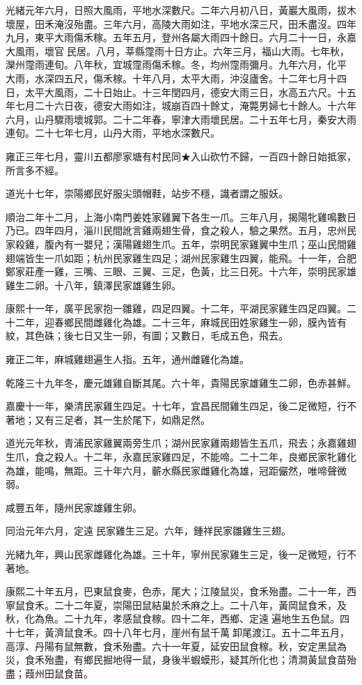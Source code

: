 \begin{pinyinscope}
光緒元年六月，日照大風雨，平地水深數尺。二年六月初八日，黃巖大風雨，拔木壞屋，田禾淹沒殆盡。三年六月，高陵大雨如注，平地水深三尺，田禾盡沒。四年九月，東平大雨傷禾稼。五年五月，登州各屬大雨四十餘日。六月二十一日，永嘉大風雨，壞官民居。八月，莘縣霪雨十日方止。六年三月，福山大雨。七年秋，灤州霪雨連旬。八年秋，宜城霪雨傷禾稼。冬，均州霪雨彌月。九年六月，化平大雨，水深四五尺，傷禾稼。十年八月，太平大雨，沖沒廬舍。十二年七月十四日，太平大風雨，二十日始止。十三年閏四月，德安大雨三日，水高五六尺。十五年七月二十六日夜，德安大雨如注，城崩百四十餘丈，淹斃男婦七十餘人。十六年六月，山丹驟雨壞城郭。二十二年春，寧津大雨壞民居。二十五年七月，秦安大雨連旬。二十七年七月，山丹大雨，平地水深數尺。

雍正三年七月，靈川五都廖家塘有村民同★入山砍竹不歸，一百四十餘日始抵家，所言多不經。

道光十七年，崇陽鄉民好服尖頭帽鞋，站步不穩，識者謂之服妖。

順治二年十二月，上海小南門姜姓家雞翼下各生一爪。三年八月，揭陽牝雞鳴數日乃已。四年四月，淄川民間訛言雞兩翅生骨，食之殺人，驗之果然。五月，忠州民家殺雞，腹內有一嬰兒；漢陽雞翅生爪。五年，崇明民家雞翼中生爪；巫山民間雞翅端皆生一爪如距；杭州民家雞生四足；湖州民家雞生四翼，能飛。十一年，合肥鄭家莊產一雞，三嘴、三眼、三翼、三足，色黃，比三日死。十六年，崇明民家雄雞生二卵。十八年，鎮澤民家雄雞生卵。

康熙十一年，廣平民家抱一雛雞，四足四翼。十二年，平湖民家雞生四足四翼。二十二年，迎春鄉民間雌雞化為雄。二十三年，麻城民田姓家雞生一卵，膜內皆有紋，其色硃；後七日又生一卵，有圖；又數日，毛成五色，飛去。

雍正二年，麻城雞翅遍生人指。五年，通州雌雞化為雄。

乾隆三十九年冬，慶元雄雞自斷其尾。六十年，貴陽民家雄雞生二卵，色赤甚鮮。

嘉慶十一年，樂清民家雞生四足。十七年，宜昌民間雞生四足，後二足微短，行不著地；又有三足者，其一生於尾下，如鼎足然。

道光元年秋，青浦民家雞翼兩旁生爪；湖州民家雞兩翅皆生五爪，飛去；永嘉雞翅生爪，食之殺人。十二年，永嘉民家雞四足，不能啼。二十二年，良鄉民家牝雞化為雄，能鳴，無距。三十年六月，蘄水縣民家雌雞化為雄，冠距儼然，唯啼聲微弱。

咸豐五年，隨州民家雄雞生卵。

同治元年六月，定遠民家雞生三足。六年，鍾祥民家雛雞生三翅。

光緒九年，興山民家雌雞化為雄。三十年，寧州民家雞生三足，後一足微短，行不著地。

康熙二十年五月，巴東鼠食麥，色赤，尾大；江陵鼠災，食禾殆盡。二十一年，西寧鼠食禾。二十二年夏，崇陽田鼠結巢於禾麻之上。二十八年，黃岡鼠食禾，及秋，化為魚。二十九年，孝感鼠食稼。四十二年，西鄉、定遠遍地生五色鼠。四十七年，黃濟鼠食禾。四十八年七月，崖州有鼠千萬卸尾渡江。五十二年五月，高淳、丹陽有鼠無數，食禾殆盡。六十一年夏，延安田鼠食稼。秋，安定黑鼠為災，食禾殆盡，有鄉民掘地得一鼠，身後半蝦蟆形，疑其所化也；清澗黃鼠食苗殆盡；葭州田鼠食苗。


\end{pinyinscope}
